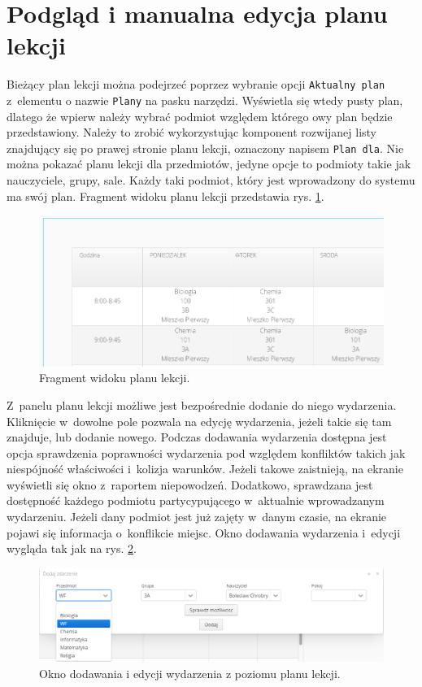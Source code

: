 \documentclass[a4paper]{book}
\begin{document}
{\section{Podgląd i manualna edycja planu lekcji}
Bieżący plan lekcji można podejrzeć poprzez wybranie opcji \lstinline|Aktualny plan| z~elementu o nazwie \lstinline|Plany| na pasku narzędzi. Wyświetla się wtedy pusty plan, dlatego że wpierw należy wybrać podmiot względem którego owy plan będzie przedstawiony. Należy to zrobić wykorzystując komponent rozwijanej listy znajdujący się po prawej stronie planu lekcji, oznaczony napisem \lstinline|Plan dla|. Nie można pokazać planu lekcji dla przedmiotów, jedyne opcje to podmioty takie jak nauczyciele, grupy, sale. Każdy taki podmiot, który jest wprowadzony do systemu ma swój plan. Fragment widoku planu lekcji przedstawia rys. \ref{id:fig:fragmentPlan}.
\begin{figure}
	\centering
	\includegraphics[width=1.0\textwidth]{./img/fragmentPlan.png}
	\caption{Fragment widoku planu lekcji.}
	\label{id:fig:fragmentPlan}
\end{figure}
Z~panelu planu lekcji możliwe jest bezpośrednie dodanie do niego wydarzenia. Kliknięcie w~dowolne pole pozwala na edycję wydarzenia, jeżeli takie się tam znajduje, lub dodanie nowego. Podczas dodawania wydarzenia dostępna jest opcja sprawdzenia poprawności wydarzenia pod względem konfliktów takich jak niespójność właściwości i~kolizja warunków. Jeżeli takowe zaistnieją, na ekranie wyświetli się okno z~raportem niepowodzeń. Dodatkowo, sprawdzana jest dostępność każdego podmiotu partycypującego w~aktualnie wprowadzanym wydarzeniu. Jeżeli dany podmiot jest już zajęty w~danym czasie, na ekranie pojawi się informacja o~konflikcie miejsc. Okno dodawania wydarzenia i~edycji wygląda tak jak na rys. \ref{id:fig:dodawanieDoPlanu}.
\begin{figure}
	\centering
	\includegraphics[width=1.0\textwidth]{./img/dodawanieDoPlanu.png}
	\caption{Okno dodawania i edycji wydarzenia z poziomu planu lekcji.}
	\label{id:fig:dodawanieDoPlanu}
\end{figure}

}
\end{document}

